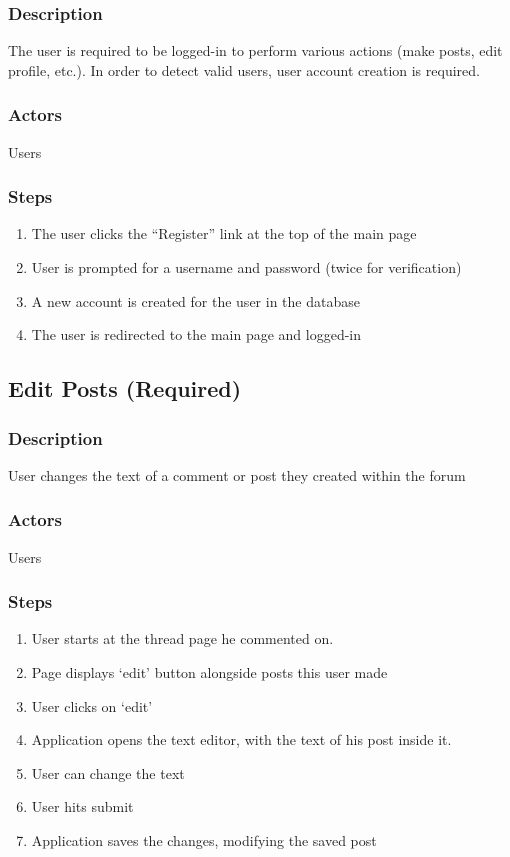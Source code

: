 \documentclass[12pt]{scrartcl}
\begin{document}
\subsubsection{Description}

The user is required to be logged-in to perform various actions (make posts, edit profile, etc.).
In order to detect valid users, user account creation is required. 

\subsubsection{Actors}

Users

\subsubsection{Steps}

\begin{enumerate}
\item The user clicks the ``Register'' link at the top of the main page
\item User is prompted for a username and password (twice for verification)
\item A new account is created for the user in the database
\item The user is redirected to the main page and logged-in
\end{enumerate}

\subsection{Edit Posts (Required)}
\subsubsection{Description}

User changes the text of a comment or post they created within the forum

\subsubsection{Actors}

Users

\subsubsection{Steps}

\begin{enumerate}
\item User starts at the thread page he commented on.
\item Page displays ‘edit’ button alongside posts this user made
\item User clicks on ‘edit’
\item Application opens the text editor, with the text of his post inside it.
\item User can change the text
\item User hits submit
\item  Application saves the changes, modifying the saved post
\end{enumerate}
\end{document}
